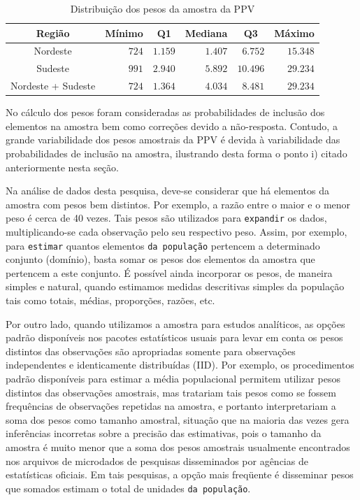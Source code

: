 \documentclass[]{book}
\numberwithin{example}{chapter}
\numberwithin{remark}{chapter}
\numberwithin{definition}{chapter}
\begin{document}
\begin{center}
\begin{table}[!htbp] \centering

\caption{Distribuição dos pesos da amostra da PPV}\bigskip \label{table:Tab12} 
\begin{tabular}{|c|r|c|r|c|r|}
\hline\hline
Região & Mínimo & Q1 & Mediana & Q3 & Máximo \\ \hline\hline
Nordeste & $724$ & \multicolumn{1}{|r|}{$1.159$} & $1.407$ & 
\multicolumn{1}{|r|}{$6.752$} & $15.348$ \\ 
Sudeste & $991$ & \multicolumn{1}{|r|}{$2.940$} & $5.892$ & 
\multicolumn{1}{|r|}{$10.496$} & $29.234$ \\ 
Nordeste + Sudeste & $724$ & \multicolumn{1}{|r|}{$1.364$} & $4.034$ & 
\multicolumn{1}{|r|}{$8.481$} & $29.234$ \\ \hline\hline
\end{tabular}

\end{table}

\end{center}

No cálculo dos pesos foram consideradas as probabilidades de inclusão
dos elementos na amostra bem como correções devido a não-resposta.
Contudo, a grande variabilidade dos pesos amostrais da PPV é devida à
variabilidade das probabilidades de inclusão na amostra, ilustrando
desta forma o ponto i) citado anteriormente nesta seção.

Na análise de dados desta pesquisa, deve-se considerar que há elementos
da amostra com pesos bem distintos. Por exemplo, a razão entre o maior e
o menor peso é cerca de 40 vezes. Tais pesos são utilizados para
\texttt{expandir} os dados, multiplicando-se cada observação pelo seu
respectivo peso. Assim, por exemplo, para \texttt{estimar} quantos
elementos \texttt{da\ população} pertencem a determinado conjunto
(domínio), basta somar os pesos dos elementos da amostra que pertencem a
este conjunto. É possível ainda incorporar os pesos, de maneira simples
e natural, quando estimamos medidas descritivas simples da população
tais como totais, médias, proporções, razões, etc.

Por outro lado, quando utilizamos a amostra para estudos analíticos, as
opções padrão disponíveis nos pacotes estatísticos usuais para levar em
conta os pesos distintos das observações são apropriadas somente para
observações independentes e identicamente distribuídas (IID). Por
exemplo, os procedimentos padrão disponíveis para estimar a média
populacional permitem utilizar pesos distintos das observações
amostrais, mas tratariam tais pesos como se fossem frequências de
observações repetidas na amostra, e portanto interpretariam a soma dos
pesos como tamanho amostral, situação que na maioria das vezes gera
inferências incorretas sobre a precisão das estimativas, pois o tamanho
da amostra é muito menor que a soma dos pesos amostrais usualmente
encontrados nos arquivos de microdados de pesquisas disseminados por
agências de estatísticas oficiais. Em tais pesquisas, a opção mais
freqüente é disseminar pesos que somados estimam o total de unidades
\texttt{da\ população}.
\end{document}
